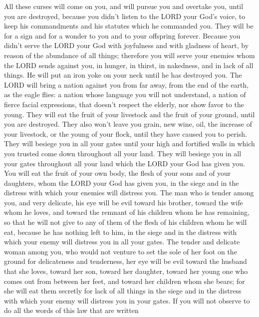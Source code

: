 \myverse{}All these curses will come on you, and will pursue you and overtake
you, until you are destroyed, because you didn’t listen to the LORD your God’s voice, to keep his commandments
and his statutes which he commanded you.
\myverse{}They will be for a sign and for a wonder to you and to your offspring forever.
\myverse{}Because you didn’t serve the LORD your God with joyfulness and with gladness
of heart, by reason of the abundance of all things;
\myverse{}therefore you will serve your enemies whom the LORD sends against you, in
hunger, in thirst, in nakedness, and in lack of all things. He will put an iron yoke on your neck until
he has destroyed you.
\myverse{}The LORD will bring a nation against you from far away, from the end of the
earth, as the eagle flies: a nation whose language you will not understand,
\myverse{}a nation of fierce facial expressions, that doesn’t respect the elderly,
nor show favor to the young.
\myverse{}They will eat the fruit of your livestock and the fruit of your ground, until
you are destroyed. They also won’t leave you grain, new wine, oil, the increase of your livestock, or
the young of your flock, until they have caused you to perish.
\myverse{}They will besiege you in all your gates until your high and fortified walls
in which you trusted come down throughout all your land. They will besiege you in all your gates throughout
all your land which the LORD your God has given you.
\myverse{}You will eat the fruit of your own body, the flesh of your sons and of your
daughters, whom the LORD your God has given you, in the siege and in the distress with which your enemies
will distress you.
\myverse{}The man who is tender among you, and very delicate, his eye will be evil
toward his brother, toward the wife whom he loves, and toward the remnant of his children whom he has
remaining,
\myverse{}so that he will not give to any of them of the flesh of his children whom
he will eat, because he has nothing left to him, in the siege and in the distress with which your enemy
will distress you in all your gates.
\myverse{}The tender and delicate woman among you, who would not venture to set the
sole of her foot on the ground for delicateness and tenderness, her eye will be evil toward the husband
that she loves, toward her son, toward her daughter,
\myverse{}toward her young one who comes out from between her feet, and toward her
children whom she bears; for she will eat them secretly for lack of all things in the siege and in the
distress with which your enemy will distress you in your gates.
\myverse{}If you will not observe to do all the words of this law that are written
